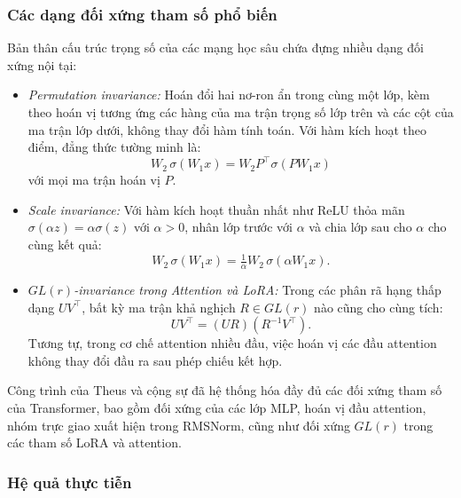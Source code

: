\subsubsection{Các dạng đối xứng tham số phổ biến}

Bản thân cấu trúc trọng số của các mạng học sâu chứa đựng nhiều dạng đối xứng nội tại:

\begin{itemize}
    \item \textit{Permutation invariance:} Hoán đổi hai nơ-ron ẩn trong cùng một lớp, kèm theo hoán vị tương ứng các hàng của ma trận trọng số lớp trên và các cột của ma trận lớp dưới, không thay đổi hàm tính toán. Với hàm kích hoạt theo điểm, đẳng thức tường minh là:
    \begin{equation}
        W_2\, \sigma(W_1 x) = W_2 P^\top \sigma(P W_1 x)
    \end{equation}
    với mọi ma trận hoán vị $P$.

    \item \textit{Scale invariance:} Với hàm kích hoạt thuần nhất như ReLU thỏa mãn $\sigma(\alpha z) = \alpha \sigma(z)$ với $\alpha > 0$, nhân lớp trước với $\alpha$ và chia lớp sau cho $\alpha$ cho cùng kết quả:
    \begin{equation}
        W_2\, \sigma(W_1 x) = \tfrac{1}{\alpha} W_2\, \sigma(\alpha W_1 x).
    \end{equation}

    \item \textit{$GL(r)$-invariance trong Attention và LoRA:} Trong các phân rã hạng thấp dạng $UV^\top$, bất kỳ ma trận khả nghịch $R \in GL(r)$ nào cũng cho cùng tích:
    \begin{equation}
        UV^\top = (UR)(R^{-1}V^\top).
    \end{equation}
    Tương tự, trong cơ chế attention nhiều đầu, việc hoán vị các đầu attention không thay đổi đầu ra sau phép chiếu kết hợp.
\end{itemize}

Công trình của Theus và cộng sự \cite{theus2025transformers} đã hệ thống hóa đầy đủ các đối xứng tham số của Transformer, bao gồm đối xứng của các lớp MLP, hoán vị đầu attention, nhóm trực giao xuất hiện trong RMSNorm, cũng như đối xứng $GL(r)$ trong các tham số LoRA và attention.

\subsubsection{Hệ quả thực tiễn}

